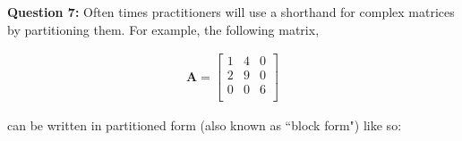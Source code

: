 \documentclass[12pt]{article}
\begin{document}
%
%
%
%

\bigskip
\textbf{Question 7:} Often times practitioners will use a shorthand for complex matrices by partitioning them. For example, the following matrix,




\begin{eqnarray*}
 \mathbf{A}=
\begin{bmatrix} 
1&4&0  \\
2&9&0\\
0&0&6\\
\end{bmatrix}
\end{eqnarray*}

can be written in partitioned form (also known as ``block form") like so:
\end{document}
